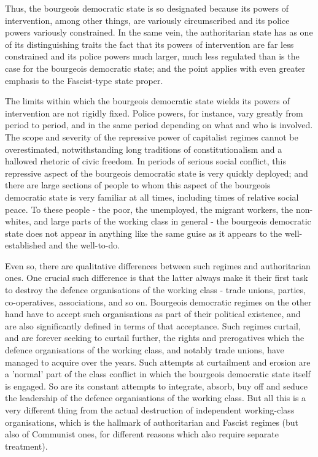 Thus, the bourgeois democratic state is so designated because its powers of intervention, among other things, are variously circumscribed and its police powers variously constrained. In the same vein, the authoritarian state has as one of its distinguishing traits the fact that its powers of intervention are far less constrained and its police powers much larger, much less regulated than is the case for the bourgeois democratic state; and the point applies with even greater emphasis to the Fascist-type state proper.

The limits within which the bourgeois democratic state wields its powers of intervention are not rigidly fixed. Police powers, for instance, vary greatly from period to period, and in the same period depending on what and who is involved. The scope and severity of the repressive power of capitalist regimes cannot be overestimated, notwithstanding long traditions of constitutionalism and a hallowed rhetoric of civic freedom. In periods of serious social conflict, this repressive aspect of the bourgeois democratic state is very quickly deployed; and there are large sections of people to whom this aspect of the bourgeois democratic state is very familiar at all times, including times of relative social peace. To these people - the poor, the unemployed, the migrant workers, the non-whites, and large parts of the working class in general - the bourgeois democratic state does not appear in anything like the same guise as it appears to the well-established and the well-to-do.

Even so, there are qualitative differences between such regimes and authoritarian ones. One crucial such difference is that the latter always make it their first task to destroy the defence organisations of the working class - trade unions, parties, co-operatives, associations, and so on. Bourgeois democratic regimes on the other hand have to accept such organisations as part of their political existence, and are also significantly defined in terms of that acceptance. Such regimes curtail, and are forever seeking to curtail further, the rights and prerogatives which the defence organisations of the working class, and notably trade unions, have managed to acquire over the years. Such attempts at curtailment and erosion are a 'normal' part of the class conflict in which the bourgeois democratic state itself is engaged. So are its constant attempts to integrate, absorb, buy off and seduce the leadership of the defence organisations of the working class. But all this is a very different thing from the actual destruction of independent working-class organisations, which is the hallmark of authoritarian and Fascist regimes (but also of Communist ones, for different reasons which also require separate treatment).

